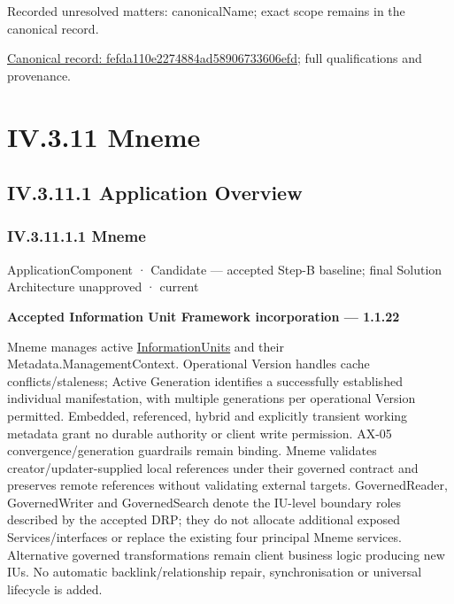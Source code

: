 {\small Recorded unresolved matters: canonicalName; exact scope remains in the canonical record.}\par
{\footnotesize \href{../../../../../../../../continuum/application/application-component/fefda110e2274884ad58906733606efd.md}{Canonical record: fefda110e2274884ad58906733606efd}; full qualifications and provenance.}\par
\section*{IV.3.11 Mneme}
\label{navigation:IV.3.11}

\subsection*{IV.3.11.1 Application Overview}
\label{navigation:IV.3.11.1}

\subsubsection*{IV.3.11.1.1 Mneme}
\label{navigation:IV.3.11.1.1}

\label{element:1af8a56358f7429fabfb57be66542a99}
{\small ApplicationComponent · Candidate — accepted Step-B baseline; final Solution Architecture unapproved · current}\par

\par\medskip\textbf{Accepted Information Unit Framework incorporation — 1.1.22}\par


Mneme manages active \hyperref[element:74ec609de1ae498fbf9d13e4ef8c6cbe]{InformationUnits} and their Metadata.ManagementContext. Operational Version handles cache conflicts/staleness; Active Generation identifies a successfully established individual manifestation, with multiple generations per operational Version permitted. Embedded, referenced, hybrid and explicitly transient working metadata grant no durable authority or client write permission. AX-05 convergence/generation guardrails remain binding. Mneme validates creator/updater-supplied local references under their governed contract and preserves remote references without validating external targets. GovernedReader, GovernedWriter and GovernedSearch denote the IU-level boundary roles described by the accepted DRP; they do not allocate additional exposed Services/interfaces or replace the existing four principal Mneme services. Alternative governed transformations remain client business logic producing new IUs. No automatic backlink/relationship repair, synchronisation or universal lifecycle is added.



